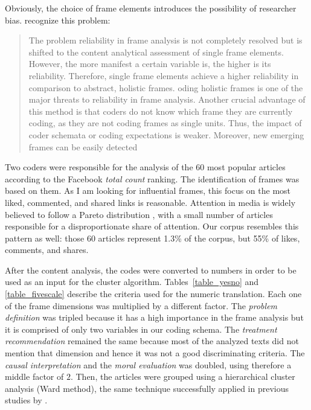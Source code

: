 Obviously, the choice of frame elements introduces the possibility of researcher bias. \citeauthor{matthes2008content} recognize this problem: \blockcquote{matthes2008content}[.]{The problem reliability in frame analysis is not completely resolved but is shifted to the content analytical assessment of single frame elements. However, the more manifest a certain variable is, the higher is its reliability. Therefore, single frame elements achieve a higher reliability in comparison to abstract, holistic frames. \textelp{} oding holistic frames is one of the major threats to reliability in frame analysis. Another crucial advantage of this method is that coders do not know which frame they are currently coding, as they are not coding frames as single units. Thus, the impact of coder schemata or coding expectations is weaker. Moreover, new emerging frames can be easily detected}

Two coders were responsible for the analysis of the 60 most popular articles according to the Facebook \emph{total count} ranking. The identification of frames was based on them. As I am looking for influential frames, this focus on the most liked, commented, and shared links is reasonable. Attention in media is widely believed to follow a Pareto distribution \autocite{miotto2014predictability}, with a small number of articles responsible for a disproportionate share of attention. Our corpus resembles this pattern as well: those 60 articles represent 1.3\% of the corpus, but 55\% of likes, comments, and shares.

After the content analysis, the codes were converted to numbers in order to be used as an input for the cluster algorithm. Tables~\ref{table_yesno} and \ref{table_fivescale} describe the criteria used for the numeric translation. Each one of the frame dimensions was multiplied by a different factor. The \emph{problem definition} was tripled because it has a high importance in the frame analysis but it is comprised of only two variables in our coding schema. The \emph{treatment recommendation} remained the same because most of the analyzed texts did not mention that dimension and hence it was not a good discriminating criteria. The \emph{causal interpretation} and the \emph{moral evaluation} was doubled, using therefore a middle factor of $2$. Then, the articles were grouped using a hierarchical cluster analysis (Ward method), the same technique successfully applied in previous studies by \citeauthor{matthes2008content} \autocite{matthes2008content,Kohring01042002}.

